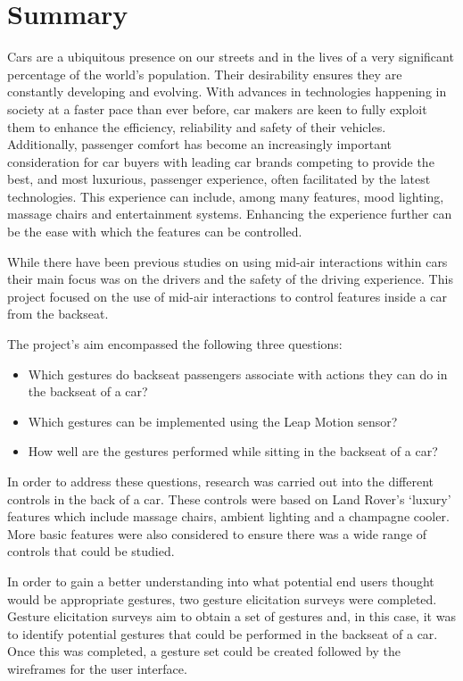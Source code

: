 \documentclass{l4proj}
\begin{document}
\section{Summary}

Cars are a ubiquitous presence on our streets and in the lives of a very significant percentage of the world’s population. Their desirability ensures they are constantly developing and evolving. With advances in technologies happening in society at a faster pace than ever before, car makers are keen to fully exploit them to enhance the efficiency, reliability and safety of their vehicles. Additionally, passenger comfort has become an increasingly important consideration for car buyers with leading car brands competing to provide the best, and most luxurious, passenger experience, often facilitated by the latest technologies. This experience can include, among many features, mood lighting, massage chairs and entertainment systems. Enhancing the experience further can be the ease with which the features can be controlled. 

While there have been previous studies on using mid-air interactions within cars their main focus was on the drivers and the safety of the driving experience. This project focused on the use of mid-air interactions to control features inside a car from the backseat.

The project’s aim encompassed the following three questions:

\begin{itemize}
\item Which gestures do backseat passengers associate with actions they can do in the backseat of a car?
\item Which gestures can be implemented using the Leap Motion sensor?
\item How well are the gestures performed while sitting in the backseat of a car?
\end{itemize}

In order to address these questions, research was carried out into the different controls in the back of a car. These controls were based on Land Rover’s ‘luxury’ features which include massage chairs, ambient lighting and a champagne cooler. More basic features were also considered to ensure there was a wide range of controls that could be studied. 

In order to gain a better understanding into what potential end users thought would be appropriate gestures, two gesture elicitation surveys were completed. Gesture elicitation surveys aim to obtain a set of gestures and, in this case, it was to identify potential gestures that could be performed in the backseat of a car. Once this was completed, a gesture set could be created followed by the wireframes for the user interface. 
\end{document}
